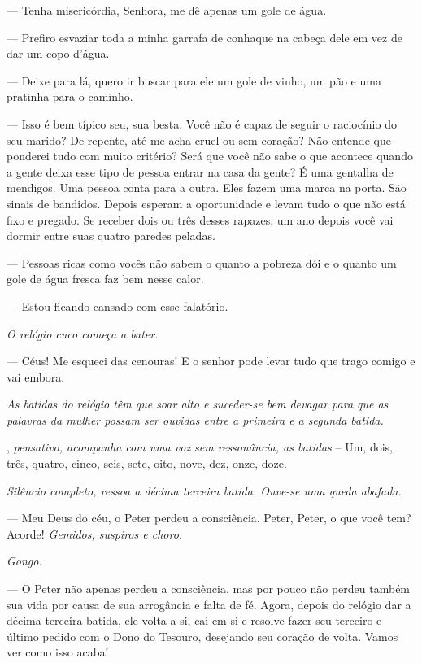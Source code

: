 \begin{myparindent}{0pt}
\begin{Parskip}
 --- Tenha misericórdia, Senhora, me dê apenas um gole de água.

 --- Prefiro esvaziar toda a minha garrafa de conhaque na cabeça
dele em vez de dar um copo d'água.

 --- Deixe para lá, quero ir buscar para ele um gole de vinho, um
pão e uma pratinha para o caminho.

 --- Isso é bem típico seu, sua besta. Você não é capaz de seguir o
raciocínio do seu marido? De repente, até me acha cruel ou sem coração?
Não entende que ponderei tudo com muito critério? Será que você não sabe
o que acontece quando a gente deixa esse tipo de pessoa entrar na casa
da gente? É uma gentalha de mendigos. Uma pessoa conta para a outra.
Eles fazem uma marca na porta. São sinais de bandidos. Depois esperam a
oportunidade e levam tudo o que não está fixo e pregado. Se receber dois
ou três desses rapazes, um ano depois você vai dormir entre suas quatro
paredes peladas.

 --- Pessoas ricas como vocês não sabem o quanto a pobreza dói e o
quanto um gole de água fresca faz bem nesse calor.

 --- Estou ficando cansado com esse falatório.

\emph{O relógio cuco começa a bater.}

 --- Céus! Me esqueci das cenouras! E o senhor pode levar tudo que
trago comigo e vai embora.

\emph{As batidas do relógio têm que soar alto e suceder-se bem devagar
para que as palavras da mulher possam ser ouvidas entre a primeira e a
segunda batida.}

, \emph{pensativo, acompanha com uma voz sem ressonância, as
batidas} -- Um, dois, três, quatro, cinco, seis, sete, oito, nove, dez,
onze, doze.

\emph{Silêncio completo, ressoa a décima terceira batida. Ouve-se uma
queda abafada.}

 --- Meu Deus do céu, o Peter perdeu a consciência. Peter, Peter,
o que você tem? Acorde! \emph{Gemidos, suspiros e choro.}

\emph{Gongo.}

 --- O Peter não apenas perdeu a consciência, mas por pouco não
perdeu também sua vida por causa de sua arrogância e falta de fé. Agora,
depois do relógio dar a décima terceira batida, ele volta a si, cai em
si e resolve fazer seu terceiro e último pedido com o Dono do Tesouro,
desejando seu coração de volta. Vamos ver como isso acaba!


\end{Parskip}
\end{myparindent}
